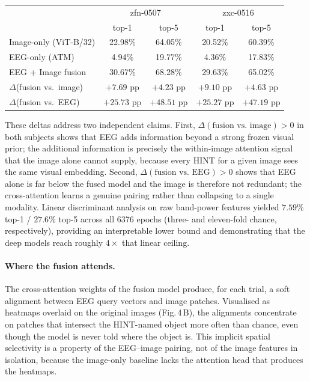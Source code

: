 \documentclass[12pt]{article}
\begin{document}
\begin{center}
\begin{tabular}{lcc|cc}
\hline
                       & \multicolumn{2}{c|}{zfn-0507} & \multicolumn{2}{c}{zxc-0516} \\
                       & top-1 & top-5 & top-1 & top-5 \\ \hline
Image-only (ViT-B/32)  & 22.98\% & 64.05\% & 20.52\% & 60.39\% \\
EEG-only (ATM)         &  4.94\% & 19.77\% &  4.36\% & 17.83\% \\
EEG + Image fusion     & 30.67\% & 68.28\% & 29.63\% & 65.02\% \\ \hline
$\Delta$(fusion vs.\ image) & $+7.69$ pp & $+4.23$ pp & $+9.10$ pp & $+4.63$ pp \\
$\Delta$(fusion vs.\ EEG)   & $+25.73$ pp & $+48.51$ pp & $+25.27$ pp & $+47.19$ pp \\ \hline
\end{tabular}
\end{center}

These deltas address two independent claims.  First,
$\Delta(\mbox{fusion vs.\ image}) > 0$ in both subjects shows
that EEG adds information beyond a strong frozen visual prior;
the additional information is precisely the within-image attention
signal that the image alone cannot supply, because every HINT for
a given image sees the same visual embedding.  Second,
$\Delta(\mbox{fusion vs.\ EEG}) > 0$ shows that EEG alone is far
below the fused model and the image is therefore not redundant; the
cross-attention learns a genuine pairing rather than collapsing to
a single modality.  Linear discriminant analysis on raw band-power
features yielded $7.59\%$ top-1 / $27.6\%$ top-5 across all
6376 epochs (three- and eleven-fold chance, respectively),
providing an interpretable lower bound and demonstrating that the
deep models reach roughly $4\times$ that linear ceiling.

\paragraph*{Where the fusion attends.}
The cross-attention weights of the fusion model produce, for each
trial, a soft alignment between EEG query vectors and image
patches.  Visualised as heatmaps overlaid on the original images
(Fig.\,4\,B), the alignments concentrate on patches that intersect
the HINT-named object more often than chance, even though the
model is never told where the object is.  This implicit spatial
selectivity is a property of the EEG--image pairing, not of the
image features in isolation, because the image-only baseline lacks
the attention head that produces the heatmaps.
\end{document}
